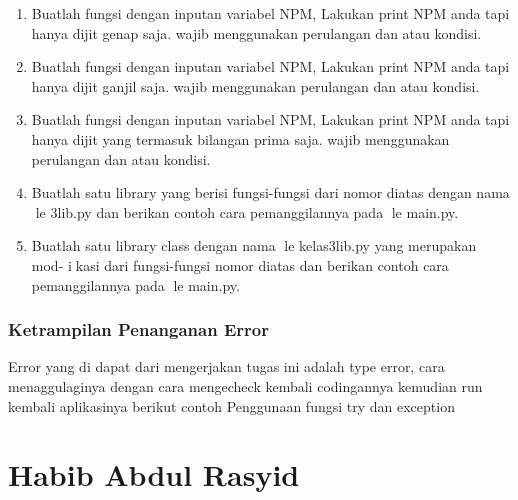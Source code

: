 \begin{enumerate}
    \item Buatlah fungsi dengan inputan variabel NPM, Lakukan print NPM anda tapi
    hanya dijit genap saja. wajib menggunakan perulangan dan atau kondisi.
    

    \item Buatlah fungsi dengan inputan variabel NPM, Lakukan print NPM anda tapi
    hanya dijit ganjil saja. wajib menggunakan perulangan dan atau kondisi.
    

    \item Buatlah fungsi dengan inputan variabel NPM, Lakukan print NPM anda tapi
    hanya dijit yang termasuk bilangan prima saja. wajib menggunakan perulangan
    dan atau kondisi.
    

    \item Buatlah satu library yang berisi fungsi-fungsi dari nomor diatas dengan nama
    le 3lib.py dan berikan contoh cara pemanggilannya pada le main.py.
    

    \item Buatlah satu library class dengan nama le kelas3lib.py yang merupakan mod-
    ikasi dari fungsi-fungsi nomor diatas dan berikan contoh cara pemanggilannya
    pada le main.py.
    
    
\end{enumerate}
\subsubsection{Ketrampilan Penanganan Error}
Error yang di dapat dari mengerjakan tugas ini adalah type error, cara menaggulaginya dengan cara mengecheck kembali codingannya
kemudian run kembali aplikasinya
berikut contoh Penggunaan fungsi try dan exception

\section{Habib Abdul Rasyid}

